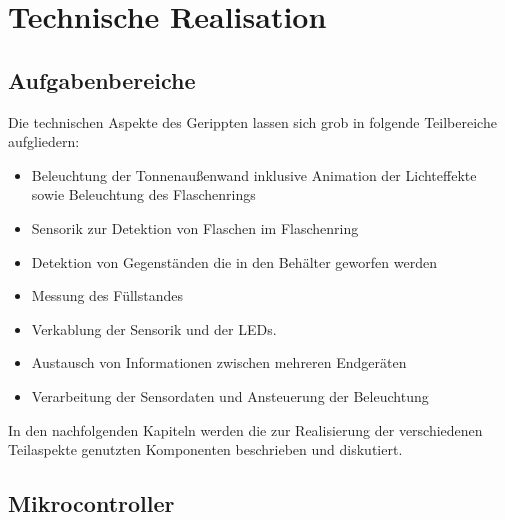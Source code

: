 \chapter{Technische Realisation}

\section{Aufgabenbereiche}

    Die technischen Aspekte des Gerippten lassen sich grob in folgende Teilbereiche aufgliedern:

    \begin{itemize}
        \item Beleuchtung der Tonnenaußenwand inklusive Animation der Lichteffekte sowie Beleuchtung des Flaschenrings
        \item Sensorik zur Detektion von Flaschen im Flaschenring
        \item Detektion von Gegenständen die in den Behälter geworfen werden
        \item Messung des Füllstandes
        \item Verkablung der Sensorik und der LEDs.
        \item Austausch von Informationen zwischen mehreren Endgeräten
        \item Verarbeitung der Sensordaten und Ansteuerung der Beleuchtung
    \end{itemize}

    In den nachfolgenden Kapiteln werden die zur Realisierung der verschiedenen Teilaspekte genutzten Komponenten beschrieben und diskutiert.


\section{Mikrocontroller}

